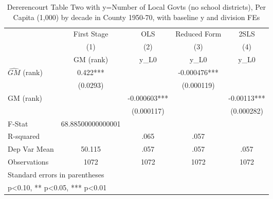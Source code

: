 \begin{table}[htbp]\centering
\def\sym#1{\ifmmode^{#1}\else\(^{#1}\)\fi}
\caption{Dererencourt Table Two with y=Number of Local Govts (no school districts), Per Capita (1,000) by decade in County 1950-70, with baseline y and division FEs}
\begin{tabular}{l*{4}{c}}
\toprule
                    & First Stage   &         OLS   &Reduced Form   &        2SLS   \\
                    &\multicolumn{1}{c}{(1)}&\multicolumn{1}{c}{(2)}&\multicolumn{1}{c}{(3)}&\multicolumn{1}{c}{(4)}\\
                    &\multicolumn{1}{c}{GM  (rank)}&\multicolumn{1}{c}{y\_L0}&\multicolumn{1}{c}{y\_L0}&\multicolumn{1}{c}{y\_L0}\\
\midrule
$\hat{GM}$ (rank)   &       0.422***&               &   -0.000476***&               \\
                    &    (0.0293)   &               &  (0.000119)   &               \\
\addlinespace
GM  (rank)          &               &   -0.000603***&               &    -0.00113***\\
                    &               &  (0.000117)   &               &  (0.000282)   \\
\midrule
F-Stat              &68.88500000000001   &               &               &               \\
R-squared           &               &        .065   &        .057   &               \\
Dep Var Mean        &      50.115   &        .057   &        .057   &        .057   \\
Observations        &        1072   &        1072   &        1072   &        1072   \\
\bottomrule
\multicolumn{5}{l}{\footnotesize Standard errors in parentheses}\\
\multicolumn{5}{l}{\footnotesize * p<0.10, ** p<0.05, *** p<0.01}\\
\end{tabular}
\end{table}
